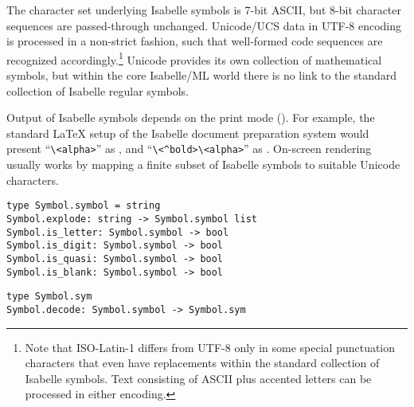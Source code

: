 \begin{isabellebody}
\begin{isamarkuptext}
  The character set underlying Isabelle symbols is 7-bit ASCII, but
  8-bit character sequences are passed-through unchanged.  Unicode/UCS
  data in UTF-8 encoding is processed in a non-strict fashion, such
  that well-formed code sequences are recognized
  accordingly.\footnote{Note that ISO-Latin-1 differs from UTF-8 only
  in some special punctuation characters that even have replacements
  within the standard collection of Isabelle symbols.  Text consisting
  of ASCII plus accented letters can be processed in either encoding.}
  Unicode provides its own collection of mathematical symbols, but
  within the core Isabelle/ML world there is no link to the standard
  collection of Isabelle regular symbols.

  \medskip Output of Isabelle symbols depends on the print mode
  (\cite{isabelle-isar-ref}).  For example, the standard {\LaTeX}
  setup of the Isabelle document preparation system would present
  ``\verb,\,\verb,<alpha>,'' as , and
  ``\verb,\,\verb,<^bold>,\verb,\,\verb,<alpha>,'' as .
  On-screen rendering usually works by mapping a finite subset of
  Isabelle symbols to suitable Unicode characters.%
\end{isamarkuptext}%
\isamarkuptrue%
%
\isadelimmlref
%
\endisadelimmlref
%
\isatagmlref
%
\begin{isamarkuptext}%
\begin{mldecls}
  \verb|type Symbol.symbol = string| \\
  \verb|Symbol.explode: string -> Symbol.symbol list| \\
  \verb|Symbol.is_letter: Symbol.symbol -> bool| \\
  \verb|Symbol.is_digit: Symbol.symbol -> bool| \\
  \verb|Symbol.is_quasi: Symbol.symbol -> bool| \\
  \verb|Symbol.is_blank: Symbol.symbol -> bool| \\
  \end{mldecls}
  \begin{mldecls}
  \verb|type Symbol.sym| \\
  \verb|Symbol.decode: Symbol.symbol -> Symbol.sym| \\
  \end{mldecls}


\end{isamarkuptext}
\end{isabellebody}
